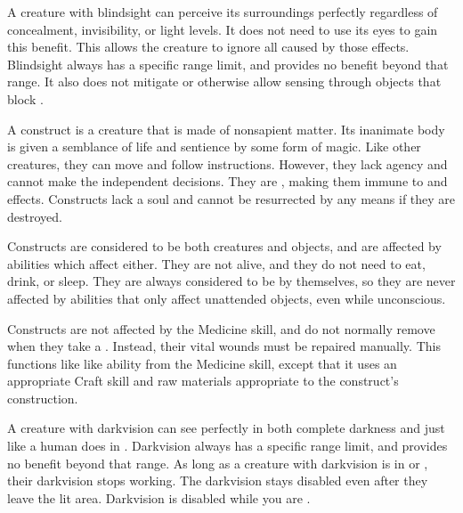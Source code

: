   A creature with blindsight can perceive its surroundings perfectly regardless of concealment, invisibility, or light levels.
  It does not need to use its eyes to gain this benefit.
  This allows the creature to ignore all  caused by those effects.
  Blindsight always has a specific range limit, and provides no benefit beyond that range.
  It also does not mitigate  or otherwise allow sensing through objects that block .

    A construct is a creature that is made of nonsapient matter.
    Its inanimate body is given a semblance of life and sentience by some form of magic.
    Like other creatures, they can move and follow instructions.
    However, they lack agency and cannot make the independent decisions.
    They are , making them immune to  and  effects.
    Constructs lack a soul and cannot be resurrected by any means if they are destroyed.

    Constructs are considered to be both creatures and objects, and are affected by abilities which affect either.
    They are not alive, and they do not need to eat, drink, or sleep.
    They are always considered to be  by themselves, so they are never affected by abilities that only affect unattended objects, even while unconscious.

    Constructs are not affected by the Medicine skill, and do not normally remove  when they take a .
    Instead, their vital wounds must be repaired manually.
    This functions like like  ability from the Medicine skill, except that it uses an appropriate Craft skill and raw materials appropriate to the construct's construction.

  A creature with darkvision can see perfectly in both complete darkness and  just like a human does in .
  Darkvision always has a specific range limit, and provides no benefit beyond that range.
  As long as a creature with darkvision is in  or , their darkvision stops working.
  The darkvision  stays disabled even after they leave the lit area.
  Darkvision is disabled while you are \dazzled.

